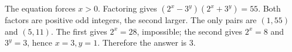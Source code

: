 The equation forces $x>0$. Factoring gives $(2^x-3^y)(2^x+3^y)=55$. Both factors are positive odd integers, the second larger. The only pairs are $(1,55)$ and $(5,11)$. The first gives $2^x=28$, impossible; the second gives $2^x=8$ and $3^y=3$, hence $x=3,y=1$. Therefore the answer is $\boxed3$.
